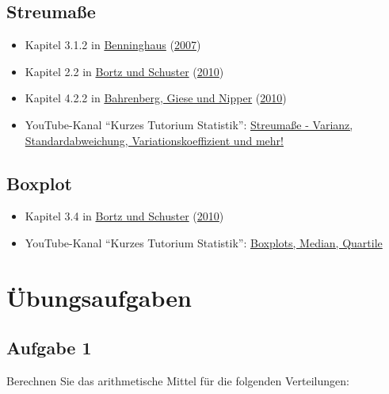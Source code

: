 \documentclass[
  11pt,
  ngerman,
  a4paper,
]{report}
\providecommand{\tightlist}{%
  \setlength{\itemsep}{0pt}\setlength{\parskip}{0pt}}
\begin{document}
\hypertarget{streumauxdfe-1}{%
\subsection{Streumaße}\label{streumauxdfe-1}}

\begin{itemize}
\tightlist
\item
  Kapitel 3.1.2 in \protect\hyperlink{ref-benninghaus}{Benninghaus} (\protect\hyperlink{ref-benninghaus}{2007})
\item
  Kapitel 2.2 in \protect\hyperlink{ref-bortz}{Bortz und Schuster} (\protect\hyperlink{ref-bortz}{2010})
\item
  Kapitel 4.2.2 in \protect\hyperlink{ref-bahrenberg}{Bahrenberg, Giese und Nipper} (\protect\hyperlink{ref-bahrenberg}{2010})
\item
  YouTube-Kanal \enquote{Kurzes Tutorium Statistik}: \href{https://www.youtube.com/watch?v=3oZrS3ZWVcA}{Streumaße - Varianz, Standardabweichung, Variationskoeffizient und mehr!}
\end{itemize}

\hypertarget{boxplot-1}{%
\subsection{Boxplot}\label{boxplot-1}}

\begin{itemize}
\tightlist
\item
  Kapitel 3.4 in \protect\hyperlink{ref-bortz}{Bortz und Schuster} (\protect\hyperlink{ref-bortz}{2010})
\item
  YouTube-Kanal \enquote{Kurzes Tutorium Statistik}: \href{https://www.youtube.com/watch?v=HsDeAoBOyS4}{Boxplots, Median, Quartile}
\end{itemize}

\hypertarget{uxfcbungsaufgaben-1}{%
\section*{Übungsaufgaben}\label{uxfcbungsaufgaben-1}}

\hypertarget{aufgabe-1-1}{%
\subsection{Aufgabe 1}\label{aufgabe-1-1}}

Berechnen Sie das arithmetische Mittel für die folgenden Verteilungen:
\end{document}
